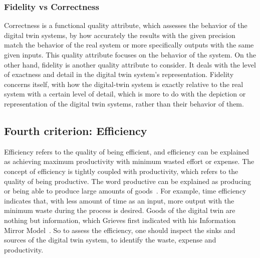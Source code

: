 \documentclass{llncs}
\begin{document}
    \subsubsection*{Fidelity vs Correctness}
    Correctness is a functional quality attribute, which assesses the behavior of the digital twin systems, by how accurately the results with the given precision match the behavior of the real system or more
    specifically outputs with the same given inputs. 
    This quality attribute focuses on the behavior of the system.
    On the other hand, fidelity is another quality attribute to consider. 
    It deals with the level of exactness and detail in the digital twin system's representation. 
    Fidelity concerns itself, with how the digital-twin system is exactly relative to the real system with a certain level of detail, which is more to do with the depiction or representation of the digital twin systems, rather than their behavior of them.

    \subsection{Fourth criterion: Efficiency}
    Efficiency refers to the quality of being efficient, and efficiency can be explained as achieving maximum productivity with minimum wasted effort or expense. 
    The concept of efficiency is tightly coupled with productivity, which refers to the quality of being productive. The word productive can be explained as producing or being able to produce large amounts of goods~\cite{OxfordDictionary}.
    For example, time efficiency indicates that,  with less amount of time as an input, more output with the minimum waste during the process is desired. Goods of the digital twin are nothing but information, 
    which Grieves first indicated with his Information Mirror Model~\cite{GrievesPLMBook}. So to assess the efficiency, one should inspect the sinks and sources of the digital twin system, to identify the waste, expense and productivity. 
\end{document}
